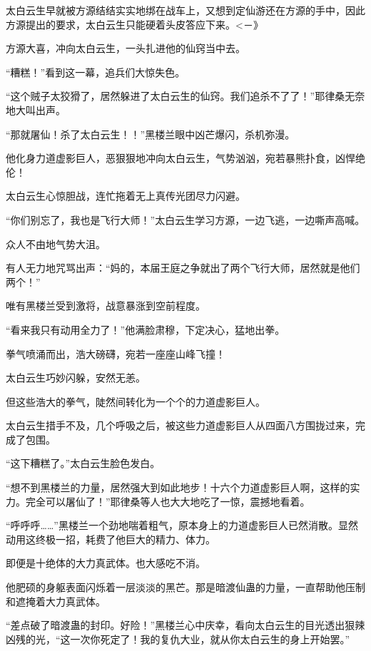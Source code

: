 
\begin{this_body}

太白云生早就被方源结结实实地绑在战车上，又想到定仙游还在方源的手中，因此方源提出的要求，太白云生只能硬着头皮答应下来。<－》

方源大喜，冲向太白云生，一头扎进他的仙窍当中去。

“糟糕！”看到这一幕，追兵们大惊失色。

“这个贼子太狡猾了，居然躲进了太白云生的仙窍。我们追杀不了了！”耶律桑无奈地大叫出声。

“那就屠仙！杀了太白云生！！”黑楼兰眼中凶芒爆闪，杀机弥漫。

他化身力道虚影巨人，恶狠狠地冲向太白云生，气势汹汹，宛若暴熊扑食，凶悍绝伦！

太白云生心惊胆战，连忙拖着无上真传光团尽力闪避。

“你们别忘了，我也是飞行大师！”太白云生学习方源，一边飞逃，一边嘶声高喊。

众人不由地气势大沮。

有人无力地咒骂出声：“妈的，本届王庭之争就出了两个飞行大师，居然就是他们两个！”

唯有黑楼兰受到激将，战意暴涨到空前程度。

“看来我只有动用全力了！”他满脸肃穆，下定决心，猛地出拳。

拳气喷涌而出，浩大磅礴，宛若一座座山峰飞撞！

太白云生巧妙闪躲，安然无恙。

但这些浩大的拳气，陡然间转化为一个个的力道虚影巨人。

太白云生措手不及，几个呼吸之后，被这些力道虚影巨人从四面八方围拢过来，完成了包围。

“这下糟糕了。”太白云生脸色发白。

“想不到黑楼兰的力量，居然强大到如此地步！十六个力道虚影巨人啊，这样的实力。完全可以屠仙了！”耶律桑等人也大大地吃了一惊，震撼地看着。

“呼呼呼……”黑楼兰一个劲地喘着粗气，原本身上的力道虚影巨人已然消散。显然动用这终极一招，耗费了他巨大的精力、体力。

即便是十绝体的大力真武体。也大感吃不消。

他肥硕的身躯表面闪烁着一层淡淡的黑芒。那是暗渡仙蛊的力量，一直帮助他压制和遮掩着大力真武体。

“差点破了暗渡蛊的封印。好险！”黑楼兰心中庆幸，看向太白云生的目光透出狠辣凶残的光，“这一次你死定了！我的复仇大业，就从你太白云生的身上开始罢。”


\end{this_body}
